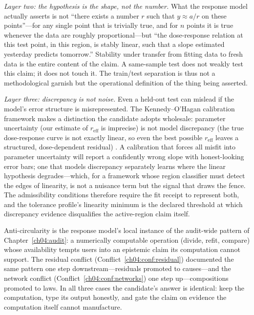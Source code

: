 \emph{Layer two: the hypothesis is the shape, not the number.} What the
response model actually asserts is not ``there exists a number $r$ such
that $y \approx a/r$ on these points''---for any single point that is
trivially true, and for $n$ points it is true whenever the data are roughly
proportional---but ``the dose-response relation at this test point, in this
region, is stably linear, such that a slope estimated yesterday predicts
tomorrow.'' Stability under transfer from fitting data to fresh data is the
entire content of the claim. A same-sample test does not weakly test this
claim; it does not touch it. The train/test separation is thus not a
methodological garnish but the operational definition of the thing being
asserted.

\emph{Layer three: discrepancy is not noise.} Even a held-out test can
mislead if the model's error structure is misrepresented. The
Kennedy--O'Hagan calibration framework makes a distinction the candidate
adopts wholesale: parameter uncertainty (our estimate of
$r_{\mathrm{eff}}$ is imprecise) is not model discrepancy (the true
dose-response curve is not exactly linear, so even the best possible
$r_{\mathrm{eff}}$ leaves a structured, dose-dependent residual)
\cite{kennedyohagan}. A calibration that forces all misfit into parameter
uncertainty will report a confidently wrong slope with honest-looking error
bars; one that models discrepancy separately learns where the linear
hypothesis degrades---which, for a framework whose region classifier must
detect the edges of linearity, is not a nuisance term but the signal that
draws the fence. The admissibility conditions therefore require the fit
receipt to represent both, and the tolerance profile's linearity minimum is
the declared threshold at which discrepancy evidence disqualifies the
active-region claim itself.

\begin{remark}\label{ch06:rem:audit}
Anti-circularity is the response model's local instance of the audit-wide
pattern of Chapter~\ref{ch04:audit}: a numerically computable operation
(divide, refit, compare) whose availability tempts users into an epistemic
claim its computation cannot support. The residual conflict
(Conflict~\ref{ch04:conf:residual}) documented the same pattern one step
downstream---residuals promoted to causes---and the network conflict
(Conflict~\ref{ch04:conf:networks}) one step up---compositions promoted to
laws. In all three cases the candidate's answer is identical: keep the
computation, type its output honestly, and gate the claim on evidence the
computation itself cannot manufacture.
\end{remark}

